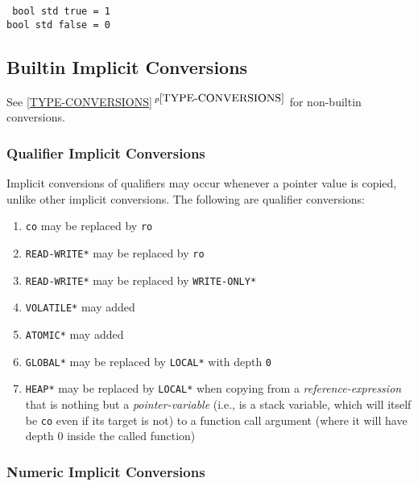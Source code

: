 \documentclass[12pt]{article}
\newcommand{\itemref}[1]{\ref{#1}$\,^{p\pageref{#1}}$}
\newenvironment{indpar}[1][0.3in]%
	{\begin{list}{}%
		     {\setlength{\itemsep}{0in}%
		      \setlength{\topsep}{0in}%
		      \setlength{\parsep}{1ex}%
		      \setlength{\labelwidth}{#1}%
		      \setlength{\leftmargin}{#1}%
		      \addtolength{\leftmargin}{\labelsep}}%
	 \item}%
	{\end{list}}
\begin{document}
\begin{indpar} \tt
bool std true = 1 \\
bool std false = 0
\end{indpar}


\subsection{Builtin Implicit Conversions}
\label{BUILTIN-IMPLICIT-CONVERSIONS}

See \itemref{TYPE-CONVERSIONS} for non-builtin conversions.

\subsubsection{Qualifier Implicit Conversions}
\label{QUALIFIER-IMPLICIT-CONVERSIONS}

Implicit conversions of qualifiers may occur whenever a pointer
value is copied, unlike other implicit conversions.
The following are qualifier conversions:
\begin{indpar}
\begin{enumerate}
\item {\tt co} may be replaced by {\tt ro}
\item {\tt *READ-WRITE*} may be replaced by {\tt ro}
\item {\tt *READ-WRITE*} may be replaced by {\tt *WRITE-ONLY*}
\item {\tt *VOLATILE*} may added
\item {\tt *ATOMIC*} may added
\item {\tt *GLOBAL*} may be replaced by {\tt *LOCAL*} with depth {\tt 0}

\item {\tt *HEAP*} may be replaced by {\tt *LOCAL*} when copying
from a {\em reference-expression} that
is nothing but a {\em pointer-variable} (i.e., is a stack
variable, which will itself be {\tt co} even if its target is not)
to a function call argument (where it will have depth 0 inside
the called function)

\end{enumerate}
\end{indpar}


\subsubsection{Numeric Implicit Conversions}
\label{NUMERIC-IMPLICIT-CONVERSIONS}
\end{document}
